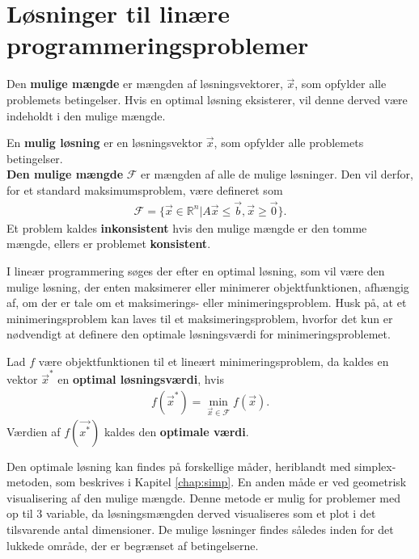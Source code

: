 \section{Løsninger til linære programmeringsproblemer}

Den \textbf{mulige mængde} er mængden af løsningsvektorer, $\vec{x}$, som opfylder alle problemets betingelser. Hvis en optimal løsning eksisterer, vil denne derved være indeholdt i den mulige mængde.

\begin{defn}
En \textbf{mulig løsning} er en løsningsvektor $\vec{x}$, som opfylder alle problemets betingelser.\\
\textbf{Den mulige mængde} $\mathcal{F}$ er mængden af alle de mulige løsninger. Den vil derfor, for et standard maksimumsproblem, være defineret som
\begin{align*}
\mathcal{F}=\{\vec{x} \in \mathds{R}^n|A\vec{x} \leq \vec{b}, \vec{x} \geq \vec{0}\}.
\end{align*}
Et problem kaldes \textbf{inkonsistent}  hvis den mulige mængde er den tomme mængde, ellers er problemet \textbf{konsistent}. 
\end{defn}

I lineær programmering søges der efter en optimal løsning, som vil være den mulige løsning, der enten maksimerer eller minimerer objektfunktionen, afhængig af, om der er tale om et maksimerings- eller minimeringsproblem. 
Husk på, at et minimeringsproblem kan laves til et maksimeringsproblem, hvorfor det kun er nødvendigt at definere den optimale løsningsværdi for minimeringsproblemet.
\begin{defn}
Lad $f$ være objektfunktionen til et lineært minimeringsproblem, da kaldes en vektor $\vec{x}^*$ en \textbf{optimal løsningsværdi}, hvis 
\begin{align}
	f(\vec{x}^*)=\min\limits_{\vec{x} \in \mathcal{F}}f(\vec{x}).
\end{align}
Værdien af $f(\vec{x^*})$ kaldes den \textbf{optimale værdi}.
\end{defn}

Den optimale løsning kan findes på forskellige måder, heriblandt med simplex-metoden, som beskrives i Kapitel \ref{chap:simp}. En anden måde er ved geometrisk visualisering af den mulige mængde. Denne metode er mulig for problemer med op til 3 variable, da løsningsmængden derved visualiseres som et plot i det tilsvarende antal dimensioner. De mulige løsninger findes således inden for det lukkede område, der er begrænset af betingelserne. 

